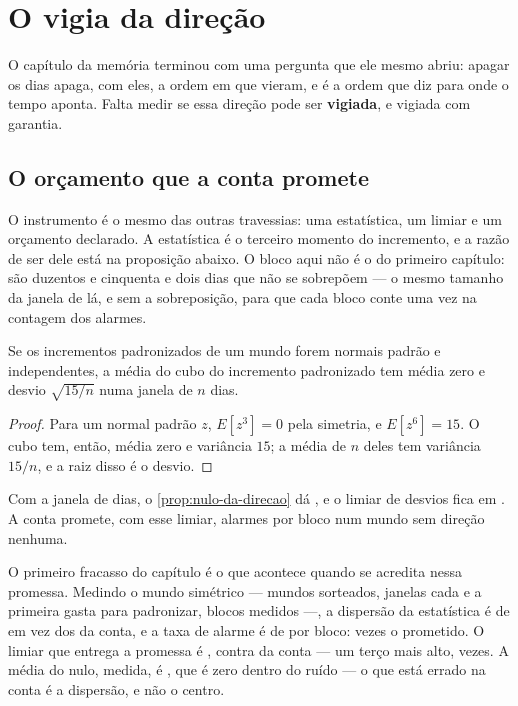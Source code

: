 \chapter{O vigia da direção}\label{cap:direcao}

O capítulo da memória terminou com uma pergunta que ele mesmo abriu: apagar os dias apaga, com eles,
a ordem em que vieram, e é a ordem que diz para onde o tempo aponta. Falta medir se essa direção pode
ser \textbf{vigiada}, e vigiada com garantia.

\section{O orçamento que a conta promete}

O instrumento é o mesmo das outras travessias: uma estatística, um limiar e um orçamento declarado. A
estatística é o terceiro momento do incremento, e a razão de ser dele está na proposição abaixo. O bloco aqui não é o do
primeiro capítulo: são duzentos e cinquenta e dois dias que não se sobrepõem --- o mesmo tamanho da janela de lá, e sem
a sobreposição, para que cada bloco conte uma vez na contagem dos alarmes.

\begin{proposicao}\label{prop:nulo-da-direcao}
Se os incrementos padronizados de um mundo forem normais padrão e independentes, a média do cubo do
incremento padronizado tem média zero e desvio $\sqrt{15/n}$ numa janela de $n$ dias.
\end{proposicao}

\begin{proof}
Para um normal padrão $z$, $E[z^3] = 0$ pela simetria, e $E[z^6] = 15$. O cubo tem, então, média
zero e variância $15$; a média de $n$ deles tem variância $15/n$, e a raiz disso é o desvio.
\end{proof}

Com a janela de \numDirecaoJanela{} dias, o \cref{prop:nulo-da-direcao} dá \numDirecaoConta{}, e o limiar de
\numDirecaoZ{} desvios fica em \numDirecaoLimiar{}. A conta promete, com esse limiar,
\numDirecaoContaTaxa{} alarmes por bloco num mundo sem direção nenhuma.

O primeiro fracasso do capítulo é o que acontece quando se acredita nessa promessa. Medindo o mundo
simétrico --- \numDirecaoSementes{} mundos sorteados, \numDirecaoBlocosPorMundo{} janelas cada e a
primeira gasta para padronizar, \numDirecaoBlocosNulo{} blocos medidos ---, a dispersão da
estatística é de \numDirecaoNuloDispersao{} em vez dos \numDirecaoConta{} da conta, e a taxa de
alarme é de \numDirecaoNuloTaxa{} por bloco: \numDirecaoRazaoDasTaxas{} vezes o prometido. O limiar
que entrega a promessa é \numDirecaoLimiarMedido{}, contra \numDirecaoLimiar{} da conta --- um terço mais
alto, \numDirecaoLimiarMedidoRazao{} vezes. A média do nulo, medida, é \numDirecaoNuloMedia{}, que é zero
dentro do ruído --- o que está errado na conta é a dispersão, e não o centro.

